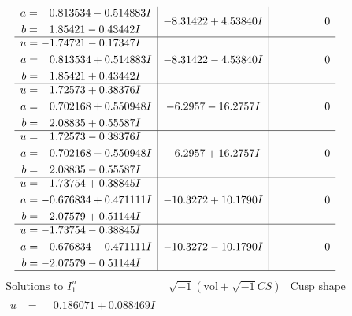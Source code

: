 \documentclass[1p]{elsarticle_modified}
\theoremstyle{definition}
\newcommand{\I}{\sqrt{-1}}
\begin{document}
$$\begin{array}{c|c|c}
\begin{aligned}
a &= \phantom{-}0.813534 - 0.514883 I \\
b &= \phantom{-}1.85421 - 0.43442 I\end{aligned}
 & -8.31422 + 4.53840 I & \phantom{-0.000000 } 0 \\ \hline\begin{aligned}
u &= -1.74721 - 0.17347 I \\
a &= \phantom{-}0.813534 + 0.514883 I \\
b &= \phantom{-}1.85421 + 0.43442 I\end{aligned}
 & -8.31422 - 4.53840 I & \phantom{-0.000000 } 0 \\ \hline\begin{aligned}
u &= \phantom{-}1.72573 + 0.38376 I \\
a &= \phantom{-}0.702168 + 0.550948 I \\
b &= \phantom{-}2.08835 + 0.55587 I\end{aligned}
 & -6.2957 - 16.2757 I & \phantom{-0.000000 } 0 \\ \hline\begin{aligned}
u &= \phantom{-}1.72573 - 0.38376 I \\
a &= \phantom{-}0.702168 - 0.550948 I \\
b &= \phantom{-}2.08835 - 0.55587 I\end{aligned}
 & -6.2957 + 16.2757 I & \phantom{-0.000000 } 0 \\ \hline\begin{aligned}
u &= -1.73754 + 0.38845 I \\
a &= -0.676834 + 0.471111 I \\
b &= -2.07579 + 0.51144 I\end{aligned}
 & -10.3272 + 10.1790 I & \phantom{-0.000000 } 0 \\ \hline\begin{aligned}
u &= -1.73754 - 0.38845 I \\
a &= -0.676834 - 0.471111 I \\
b &= -2.07579 - 0.51144 I\end{aligned}
 & -10.3272 - 10.1790 I & \phantom{-0.000000 } 0\\
 \hline 
 \end{array}$$\newpage$$\begin{array}{c|c|c}  
\text{Solutions to }I^u_{1}& \I (\text{vol} + \sqrt{-1}CS) & \text{Cusp shape}\\
 \hline 
\begin{aligned}
u &= \phantom{-}0.186071 + 0.088469 I \\

\end{aligned}
\end{array}$$
\end{document}
